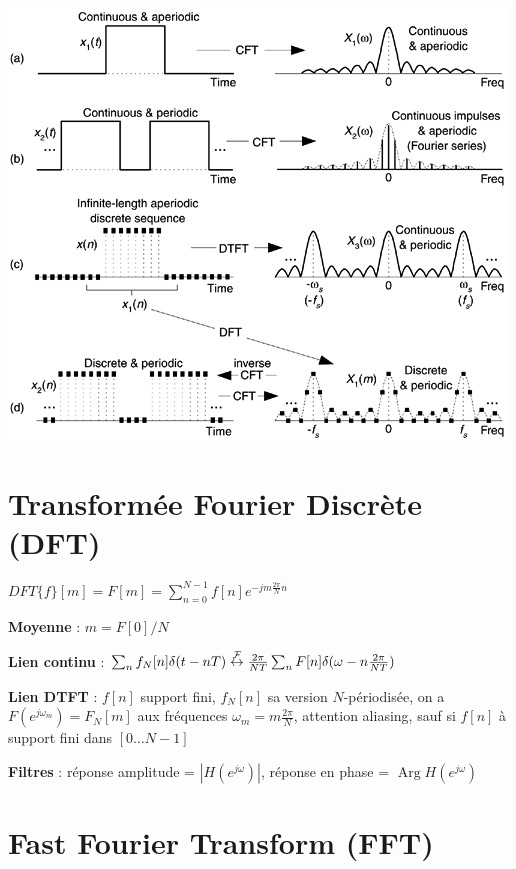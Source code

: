 \begin{Figure}
    \includegraphics[width=\linewidth]{res/lien-transformees-exemple.jpg}
\end{Figure}


\section{Transformée Fourier Discrète (DFT)}

$DFT\{f\}[m] = F[m] = \sum_{n=0}^{N-1}f[n]e^{-jm\frac{2\pi}{N}n}$

\textbf{Moyenne} : $m = F[0]/N$

\textbf{Lien continu} : $\sum_nf_N[n]\delta(t-nT) \stackrel{\mathcal{F}}{\leftrightarrow} \frac{2\pi}{NT}\sum_n F[n] \delta(\omega-n \frac{2\pi}{NT})$

\textbf{Lien DTFT} : $f[n]$ support fini, $f_N[n]$ sa version $N$-périodisée, on a $F(e^{j\omega_m}) = F_N[m]$ aux fréquences $\omega_m = m\frac{2\pi}{N}$, attention aliasing, sauf si $f[n]$ à support fini dans $[0\dots N-1]$

\textbf{Filtres} : réponse amplitude = $|H(e^{j\omega})|$, réponse en phase = $\operatorname{Arg}{H(e^{j\omega})}$


\section{Fast Fourier  Transform (FFT)}

